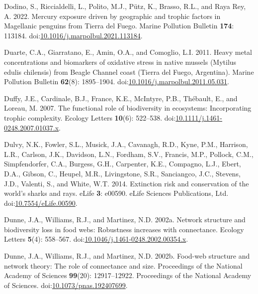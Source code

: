 \documentclass[
]{article}
\newlength{\cslhangindent}
\newenvironment{CSLReferences}[2] %
 {\begin{list}{}{%
  \setlength{\itemindent}{0pt}
  \setlength{\leftmargin}{0pt}
  \setlength{\parsep}{0pt}
  \ifodd #1
   \setlength{\leftmargin}{\cslhangindent}
   \setlength{\itemindent}{-1\cslhangindent}
  \fi
  \setlength{\itemsep}{#2\baselineskip}}}
 {\end{list}}
\begin{document}
\begin{CSLReferences}{1}{0}
Dodino, S., Riccialdelli, L., Polito, M.J., Pütz, K., Brasso, R.L., and
Raya Rey, A. 2022. Mercury exposure driven by geographic and trophic
factors in {Magellanic} penguins from {Tierra} del {Fuego}. Marine
Pollution Bulletin \textbf{174}: 113184.
doi:\href{https://doi.org/10.1016/j.marpolbul.2021.113184}{10.1016/j.marpolbul.2021.113184}.

Duarte, C.A., Giarratano, E., Amin, O.A., and Comoglio, L.I. 2011. Heavy
metal concentrations and biomarkers of oxidative stress in native
mussels ({Mytilus} edulis chilensis) from {Beagle Channel} coast
({Tierra} del {Fuego}, {Argentina}). Marine Pollution Bulletin
\textbf{62}(8): 1895--1904.
doi:\href{https://doi.org/10.1016/j.marpolbul.2011.05.031}{10.1016/j.marpolbul.2011.05.031}.

Duffy, J.E., Cardinale, B.J., France, K.E., McIntyre, P.B., Thébault,
E., and Loreau, M. 2007. The functional role of biodiversity in
ecosystems: Incorporating trophic complexity. Ecology Letters
\textbf{10}(6): 522--538.
doi:\href{https://doi.org/10.1111/j.1461-0248.2007.01037.x}{10.1111/j.1461-0248.2007.01037.x}.

Dulvy, N.K., Fowler, S.L., Musick, J.A., Cavanagh, R.D., Kyne, P.M.,
Harrison, L.R., Carlson, J.K., Davidson, L.N., Fordham, S.V., Francis,
M.P., Pollock, C.M., Simpfendorfer, C.A., Burgess, G.H., Carpenter,
K.E., Compagno, L.J., Ebert, D.A., Gibson, C., Heupel, M.R.,
Livingstone, S.R., Sanciangco, J.C., Stevens, J.D., Valenti, S., and
White, W.T. 2014. Extinction risk and conservation of the world's sharks
and rays. eLife \textbf{3}: e00590. eLife Sciences Publications, Ltd.
doi:\href{https://doi.org/10.7554/eLife.00590}{10.7554/eLife.00590}.

Dunne, J.A., Williams, R.J., and Martinez, N.D. 2002a. Network structure
and biodiversity loss in food webs: Robustness increases with
connectance. Ecology Letters \textbf{5}(4): 558--567.
doi:\href{https://doi.org/10.1046/j.1461-0248.2002.00354.x}{10.1046/j.1461-0248.2002.00354.x}.

Dunne, J.A., Williams, R.J., and Martinez, N.D. 2002b. Food-web
structure and network theory: {The} role of connectance and size.
Proceedings of the National Academy of Sciences \textbf{99}(20):
12917--12922. Proceedings of the National Academy of Sciences.
doi:\href{https://doi.org/10.1073/pnas.192407699}{10.1073/pnas.192407699}.


\end{CSLReferences}
\end{document}
